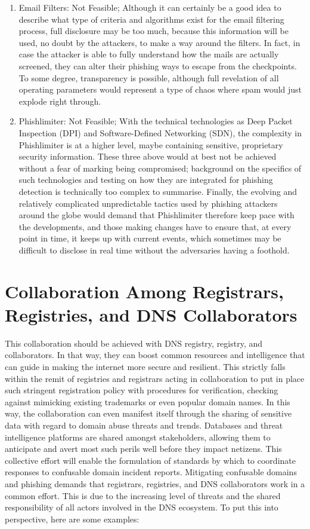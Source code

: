 \begin{enumerate}
    \item Email Filters: Not Feasible;  Although it can certainly be a good idea to describe what type of criteria and algorithms exist for the email filtering process, full disclosure may be too much, because this information will be used, no doubt by the attackers, to make a way around the filters. In fact, in case the attacker is able to fully understand how the mails are actually screened, they can alter their phishing ways to escape from the checkpoints. To some degree, transparency is possible, although full revelation of all operating parameters would represent a type of chaos where spam would just explode right through.
    
   
    \item Phishlimiter: Not Feasible; With the technical technologies as Deep Packet Inspection (DPI) and Software-Defined Networking (SDN), the complexity in Phishlimiter is at a higher level, maybe containing sensitive, proprietary security information. These three above would at best not be achieved without a fear of marking being compromised; background on the specifics of such technologies and testing on how they are integrated for phishing detection is technically too complex to summarise. Finally, the evolving and relatively complicated unpredictable tactics used by phishing attackers around the globe would demand that Phishlimiter therefore keep pace with the developments, and those making changes have to ensure that, at every point in time, it keeps up with current events, which sometimes may be difficult to disclose in real time without the adversaries having a foothold.
    
\end{enumerate}


\section{Collaboration Among Registrars, Registries, and DNS Collaborators}

This collaboration should be achieved with DNS registry, registry, and collaborators. In that way, they can boost common resources and intelligence that can guide in making the internet more secure and resilient. This strictly falls within the remit of registries and registrars acting in collaboration to put in place such stringent registration policy with procedures for verification, checking against mimicking existing trademarks or even popular domain names. In this way, the collaboration can even manifest itself through the sharing of sensitive data with regard to domain abuse threats and trends. Databases and threat intelligence platforms are shared amongst stakeholders, allowing them to anticipate and avert most such perils well before they impact netizens. This collective effort will enable the formulation of standards by which to coordinate responses to confusable domain incident reports. Mitigating confusable domains and phishing demands that registrars, registries, and DNS collaborators work in a common effort. This is due to the increasing level of threats and the shared responsibility of all actors involved in the DNS ecosystem. \cite{Catania2022} To put this into perspective, here are some examples: 


